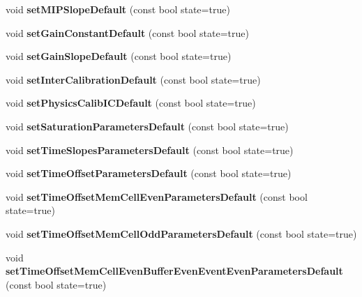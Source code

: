 \begin{DoxyCompactItemize}
\item 
void {\bfseries set\-M\-I\-P\-Slope\-Default} (const bool state=true)\label{classCALICE_1_1Ahc2CalibrationStatusBits_a93d2fb3dbcae45735a46faaea352c39b}

\item 
void {\bfseries set\-Gain\-Constant\-Default} (const bool state=true)\label{classCALICE_1_1Ahc2CalibrationStatusBits_ab4b50418d9b99b263842832f41cf6d8f}

\item 
void {\bfseries set\-Gain\-Slope\-Default} (const bool state=true)\label{classCALICE_1_1Ahc2CalibrationStatusBits_a8a9da4c25b8317896497ec216f831fc6}

\item 
void {\bfseries set\-Inter\-Calibration\-Default} (const bool state=true)\label{classCALICE_1_1Ahc2CalibrationStatusBits_adb01ce4e46929b52e7fb89dcc8e0d89b}

\item 
void {\bfseries set\-Physics\-Calib\-I\-C\-Default} (const bool state=true)\label{classCALICE_1_1Ahc2CalibrationStatusBits_a7b51b16ade7fdf0803b968e41e94303e}

\item 
void {\bfseries set\-Saturation\-Parameters\-Default} (const bool state=true)\label{classCALICE_1_1Ahc2CalibrationStatusBits_a215a322f8475633417f9727e1f073908}

\item 
void {\bfseries set\-Time\-Slopes\-Parameters\-Default} (const bool state=true)\label{classCALICE_1_1Ahc2CalibrationStatusBits_a50e4cfea2375a925be6e50fe82eda241}

\item 
void {\bfseries set\-Time\-Offset\-Parameters\-Default} (const bool state=true)\label{classCALICE_1_1Ahc2CalibrationStatusBits_ae14785cd6fda41550e221d1707613459}

\item 
void {\bfseries set\-Time\-Offset\-Mem\-Cell\-Even\-Parameters\-Default} (const bool state=true)\label{classCALICE_1_1Ahc2CalibrationStatusBits_abc392df434d705b639cb38bda371a9ca}

\item 
void {\bfseries set\-Time\-Offset\-Mem\-Cell\-Odd\-Parameters\-Default} (const bool state=true)\label{classCALICE_1_1Ahc2CalibrationStatusBits_a3777b802882728e9d84f11df1af1d905}

\item 
void {\bfseries set\-Time\-Offset\-Mem\-Cell\-Even\-Buffer\-Even\-Event\-Even\-Parameters\-Default} (const bool state=true)\label{classCALICE_1_1Ahc2CalibrationStatusBits_af810f08499af667c69cb5f8cb1b1b0de}


\end{DoxyCompactItemize}

